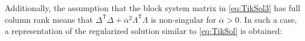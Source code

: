 \documentclass[12pt]{article}
\newcommand{\trans}[1]{{#1}^\mathsf{T}}	%
\newcommand{\regparam}{\alpha}  %
\newcommand{\zeroVec}{\bm{0}}	%
\newtheorem{corollary}{Corollary}[theorem]
\begin{document}
%
%
Additionally, the assumption that the block system matrix in \eqref{eq:TikSol3} has full column rank means that $\trans{\Delta}\Delta + \regparam^2 \trans{\Lambda}\Lambda$ is non-singular for $\regparam > 0$. In such a case, a representation of the regularized solution similar to \eqref{eq:TikSol} is obtained:
\end{document}
